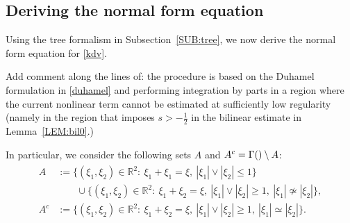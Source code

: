 \documentclass[%
11pt,  reqno]{amsart}
\makeatletter
\newcommand{\5}{\textup{V}}
\newcommand{\noi}{\noindent}
\newtheorem{example}{Example}
\theoremstyle{remark}
\newcommand{\R}{\mathbb{R}}
\newcommand{\TT}{\mathcal{T}}
\newcommand{\G}{\Gamma}
\def\<#1>{\csname MH@symb@#1\endcsname}
\def\distC{15}
\newcommand{\cherry}[3]{
	\begin{tikzpicture}[
		baseline=-8, scale=0.6, every node/.style={dotA},
		level distance=15pt,
		level 1/.style={sibling distance=\distC pt}
		]
		\node  [label=above:{$#1$}]  (root) {}
		child
		child
		;
		\node [label= left:{$#2$}]  at (root-1) {};
		\node [label= right:{$#3$}] at (root-2) {};
	\end{tikzpicture}
}
\numberwithin{equation}{section}
\numberwithin{theorem}{section}
\makeatother
\begin{document}
%
%
%
%




\subsection{Deriving the normal form equation}

Using the tree formalism in Subsection~\ref{SUB:tree}, we now derive the normal form equation for \eqref{kdv}.



{

\color{red}
Add comment along the lines of: the procedure is based on the Duhamel formulation in \eqref{duhamel} and performing integration by parts in a region where the current nonlinear term cannot be estimated at sufficiently low regularity (namely in the region that imposes $s>-\frac12$ in the bilinear estimate in Lemma~\ref{LEM:bil0}.)
}
In particular, we consider the following sets $A$ and $A^c = \G({\<1>}) \setminus A$: 
\begin{align}
\label{A}
\begin{split} 
A & := \big\{ (\xi_{1}, \xi_{2}) \in \R^2: \ \xi_{1}+ \xi_{1} = \xi, \  |\xi_{1}| \lor  |\xi_{2}| \le 1  \big\} \\
& \qquad
\cup \big\{ (\xi_{1}, \xi_{2})\in \R^2: \ \xi_{1} + \xi_{2} = \xi, \ |\xi_{1}| \lor  |\xi_{2}| \ge 1,  \ |\xi_{1}| \not\simeq |\xi_{2}| \big\}, \\
A^c & := \big\{ (\xi_{1}, \xi_2) \in \R^2: \ \xi_{1}+ \xi_{2} = \xi,  \ |\xi_{1}| \lor |\xi_{2}| \ge 1 , \ |\xi_{1}| \simeq |\xi_{2}| \big\}.
\end{split}
\end{align}
\end{document}
